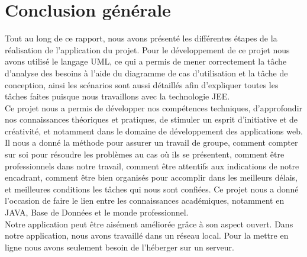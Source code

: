 \chapter*{Conclusion générale}
Tout au long de ce rapport, nous avons présenté les différentes étapes de la réalisation de l’application du projet. Pour le développement de ce projet nous avons utilisé le langage UML, ce qui a permis de mener correctement la tâche d’analyse des besoins à l’aide du diagramme de cas d’utilisation et la tâche de conception, ainsi les scénarios sont aussi détaillés afin d’expliquer toutes les tâches faites puisque nous travaillons avec la technologie JEE.\\

Ce projet nous a permis de développer nos compétences techniques, d’approfondir
nos connaissances théoriques et pratiques, de stimuler un esprit d’initiative et de
créativité, et notamment dans le domaine de développement des applications web.
Il nous a donné la méthode pour assurer un travail de groupe, comment compter sur
soi pour résoudre les problèmes au cas où ils se présentent, comment être professionnels dans notre travail, comment être attentifs aux indications de notre encadrant, comment être bien organisés pour accomplir dans les meilleurs délais, et meilleures conditions les tâches qui nous sont confiées. Ce projet nous a donné l’occasion de faire le lien entre les connaissances académiques, notamment en JAVA, Base de Données et le monde professionnel.\\

Notre application peut être aisément améliorée grâce à son aspect ouvert. Dans notre application, nous avons travaillé dans un réseau local. Pour la mettre en ligne nous avons seulement besoin de l’héberger sur un serveur.\\